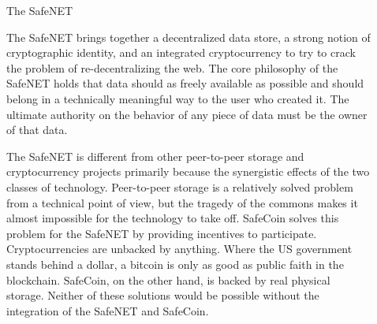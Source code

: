 \documentclass[final]{beamer}
\newlength{\sepwid}
\newlength{\onecolwid}
\newlength{\twocolwid}
\begin{document}
\begin{frame}[t]
\begin{columns}[t]
\begin{column}{\onecolwid}
\begin{block}{The SafeNET}

  The SafeNET brings together a decentralized data store, a strong notion of
  cryptographic identity, and an integrated cryptocurrency to try to crack
  the problem of re-decentralizing the web. The core philosophy of the SafeNET
  holds that data should as freely available as possible and should belong in a
  technically meaningful way to the user who created it. The ultimate authority
  on the behavior of any piece of data must be the owner of that data.

  \par

  The SafeNET is different from other peer-to-peer storage and cryptocurrency projects
  primarily because the synergistic effects of the two classes of technology.
  Peer-to-peer storage is a relatively solved problem from a technical point of view,
  but the tragedy of the commons makes it almost impossible for the technology to
  take off. SafeCoin solves this problem for the SafeNET by providing incentives to
  participate. Cryptocurrencies are unbacked by anything. Where the US government
  stands behind a dollar, a bitcoin is only as good as public faith in the blockchain.
  SafeCoin, on the other hand, is backed by real physical storage. Neither of these
  solutions would be possible without the integration of the SafeNET and SafeCoin.


\end{block}





\end{column} %

\begin{column}{\sepwid}\end{column} %

\begin{column}{\twocolwid} %

\begin{columns}[t,totalwidth=\twocolwid] %


\end{columns}
\end{column}
\end{columns}
\end{frame}
\end{document}
